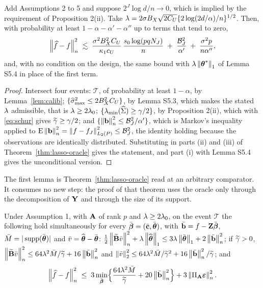 \begin{corollary}
\label{cor:instant}
Add Assumptions 2 to 5 and suppose $2^J\log d/n \to 0$, which is implied by
the requirement of Proposition 2(ii). Take
$\lambda = 2\sigma B_X\sqrt{2C_U}\{2\log(2d/\alpha)/n\}^{1/2}$. Then, with
probability at least $1-\alpha-\alpha'-\alpha''$ up to terms that tend to
zero,
\[
  \left\lVert \widehat{f}-f \right\rVert_{n}^2 \;\lesssim\;
  \frac{\sigma^2B_X^2C_U}{\kappa_1c_U}\,\frac{s_0\log(pqN_{J})}{n}
  \;+\; \frac{\mathcal{B}^2_J}{\alpha'} \;+\; \frac{\sigma^2p}{n\alpha''},
\]
and, with no condition on the design, the same bound with
$\lambda\left\lVert \boldsymbol{\theta}^{*} \right\rVert_1$ of Lemma S5.4 in place of the first term.
\end{corollary}

\begin{proof}
Intersect four events: $\mathcal{T}$, of probability at least $1-\alpha$, by
Lemma~\ref{lem:calib}; $\{\widehat{\sigma}_{\max}^2 \le 2B_X^2C_U\}$, by Lemma S5.3, which makes the stated
$\lambda$ admissible, that is $\lambda \ge 2\lambda_0$;
$\{\lambda_{\min}(\widehat{\Sigma})\ge\gamma/2\}$, by Proposition 2(ii), which with
\eqref{eq:schur} gives $\widetilde{\gamma} \ge \gamma/2$; and
$\{\left\lVert \mathbf{b} \right\rVert_{n}^2 \le \mathcal{B}_J^2/\alpha'\}$, which is Markov's inequality
applied to $\mathrm{E}\left\lVert \mathbf{b} \right\rVert_{n}^2 = \left\lVert f-f_J \right\rVert^2_{L_2(P)} \le \mathcal{B}_J^2$,
the identity holding because the observations are identically distributed.
Substituting in parts (ii) and (iii) of Theorem~\ref{thm:lasso-oracle} gives the statement, and
part (i) with Lemma S5.4 gives the unconditional version.
\end{proof}

The first lemma is Theorem~\ref{thm:lasso-oracle} read at an arbitrary comparator. It consumes no
new step: the proof of that theorem uses the oracle only through the
decomposition of $\mathbf{Y}$ and through the size of its support.

\begin{lemma}
\label{lem:comparator}
Under Assumption 1, with $\mathbf{A}$ of rank $p$ and $\lambda \ge 2\lambda_0$, on the
event $\mathcal{T}$ the following hold simultaneously for every
$\bar{\boldsymbol{\beta}} = (\bar{\mathbf{c}},\bar{\boldsymbol{\theta}})$, with $\bar{\mathbf{b}} = f - \mathbf{Z}\bar{\boldsymbol{\beta}}$,
$\bar M = |\operatorname{supp}(\bar{\boldsymbol{\theta}})|$ and $\bar v = \widehat{\boldsymbol{\theta}}-\bar{\boldsymbol{\theta}}$:
$\tfrac12\left\lVert \widetilde{\mathbf{B}}\bar v \right\rVert_{n}^2 + \lambda\left\lVert \widehat{\boldsymbol{\theta}} \right\rVert_1 \le
3\lambda\left\lVert \bar{\boldsymbol{\theta}} \right\rVert_1 + 2\left\lVert \bar{\mathbf{b}} \right\rVert_{n}^2$; if $\widetilde{\gamma}>0$,
$\left\lVert \widetilde{\mathbf{B}}\bar v \right\rVert_{n}^2 \le 64\lambda^2\bar M/\widetilde{\gamma} + 16\left\lVert \bar{\mathbf{b}} \right\rVert_{n}^2$ and
$\left\lVert \bar v \right\rVert_2^2 \le 64\lambda^2\bar M/\widetilde{\gamma}^2 +
16\left\lVert \bar{\mathbf{b}} \right\rVert_{n}^2/\widetilde{\gamma}$; and
\begin{equation}
  \label{eq:oracle-min}
  \left\lVert \widehat{f}-f \right\rVert_{n}^2 \;\le\;
  3\min_{\bar{\boldsymbol{\beta}}}\Bigl\{\frac{64\lambda^2\bar M}{\widetilde{\gamma}}
  + 20\left\lVert \bar{\mathbf{b}} \right\rVert_{n}^2\Bigr\} + 3\left\lVert \Pi_{\mathbf{A}}\boldsymbol{\varepsilon} \right\rVert_{n}^2 .
\end{equation}
\end{lemma}

